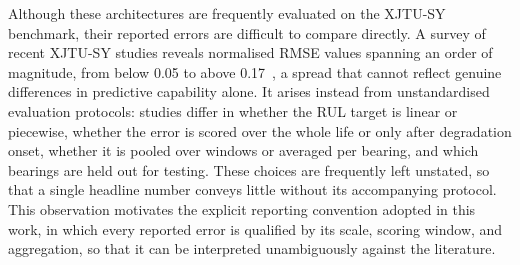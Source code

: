 \documentclass[review]{elsarticle}
\begin{document}
Although these architectures are frequently evaluated on the XJTU-SY
benchmark, their reported errors are difficult to compare directly. A
survey of recent XJTU-SY studies reveals normalised RMSE values
spanning an order of magnitude, from below 0.05 to above
0.17~\cite{QIAO2026112248, YONGXING2026104313}, a spread that cannot
reflect genuine differences in predictive capability alone. It arises
instead from unstandardised evaluation protocols: studies differ in
whether the RUL target is linear or piecewise, whether the error is
scored over the whole life or only after degradation onset, whether it
is pooled over windows or averaged per bearing, and which bearings are
held out for testing. These choices are frequently left unstated, so
that a single headline number conveys little without its accompanying
protocol. This observation motivates the explicit reporting convention
adopted in this work, in which every reported error is qualified by its
scale, scoring window, and aggregation, so that it can be interpreted
unambiguously against the literature.\\
\end{document}
